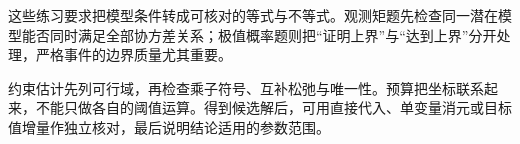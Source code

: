 这些练习要求把模型条件转成可核对的等式与不等式。观测矩题先检查同一潜在模型能否同时满足全部协方差关系；极值概率题则把“证明上界”与“达到上界”分开处理，严格事件的边界质量尤其重要。

约束估计先列可行域，再检查乘子符号、互补松弛与唯一性。预算把坐标联系起来，不能只做各自的阈值运算。得到候选解后，可用直接代入、单变量消元或目标值增量作独立核对，最后说明结论适用的参数范围。
\par\smallskip
